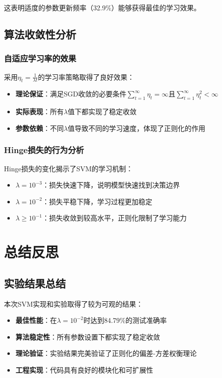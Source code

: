 \documentclass[a4paper]{article}
\begin{document}
这表明适度的参数更新频率（32.9\%）能够获得最佳的学习效果。

\subsection{算法收敛性分析}

\subsubsection{自适应学习率的效果}

采用$\eta_t = \frac{1}{\lambda t}$的学习率策略取得了良好效果：

\begin{itemize}
    \item \textbf{理论保证}：满足SGD收敛的必要条件$\sum_{t=1}^{\infty}\eta_t = \infty$且$\sum_{t=1}^{\infty}\eta_t^2 < \infty$
    \item \textbf{实际表现}：所有$\lambda$值下都实现了稳定收敛
    \item \textbf{参数依赖}：不同$\lambda$值导致不同的学习速度，体现了正则化的作用
\end{itemize}

\subsubsection{Hinge损失的行为分析}

Hinge损失的变化揭示了SVM的学习机制：

\begin{itemize}
    \item \textbf{$\lambda = 10^{-3}$}：损失快速下降，说明模型快速找到决策边界
    \item \textbf{$\lambda = 10^{-2}$}：损失平稳下降，学习过程更加稳定
    \item \textbf{$\lambda \geq 10^{-1}$}：损失收敛到较高水平，正则化限制了学习能力
\end{itemize}

\section{总结反思}
\subsection{实验结果总结}

本次SVM实现和实验取得了较为可观的结果：

\begin{itemize}
    \item \textbf{最佳性能}：在$\lambda = 10^{-2}$时达到84.79\%的测试准确率
    \item \textbf{算法稳定性}：所有参数设置下都实现了稳定收敛
    \item \textbf{理论验证}：实验结果完美验证了正则化的偏差-方差权衡理论
    \item \textbf{工程实现}：代码具有良好的模块化和可扩展性
\end{itemize}
\end{document}
